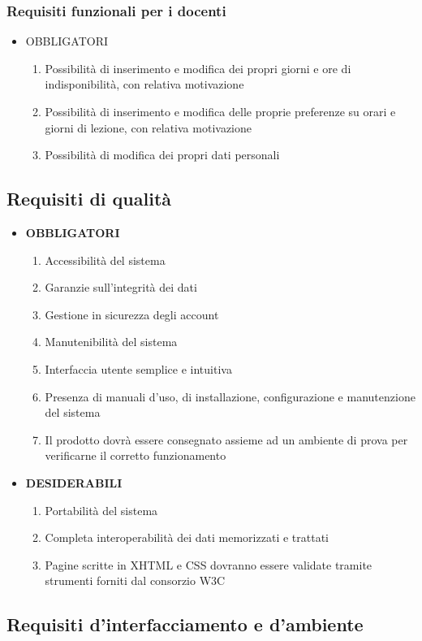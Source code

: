 \documentclass[11pt,a4paper]{article}
\begin{document}
\subsubsection{Requisiti funzionali per i docenti}
\begin{itemize}
\item \textsc{OBBLIGATORI}
\begin{enumerate}
\item Possibilità di inserimento e modifica dei propri giorni e ore di indisponibilità, con relativa motivazione
\item Possibilità di inserimento e modifica delle proprie preferenze su orari e giorni di lezione, con relativa motivazione
\item Possibilità di modifica dei propri dati personali
\end{enumerate}
\end{itemize}
\subsection{Requisiti di qualità}
\begin{itemize}
\item \textbf{OBBLIGATORI}
\begin{enumerate}
\item Accessibilità del sistema
\item Garanzie sull'integrità dei dati
\item Gestione in sicurezza degli account
\item Manutenibilità del sistema
\item Interfaccia utente semplice e intuitiva
\item Presenza di manuali d'uso, di installazione, configurazione e manutenzione del sistema
\item Il prodotto dovrà essere consegnato assieme ad un ambiente di prova per verificarne il corretto funzionamento
\end{enumerate}
\item \textbf{DESIDERABILI}
\begin{enumerate}
\item Portabilità del sistema
\item Completa interoperabilità dei dati memorizzati e trattati
\item Pagine scritte in XHTML e CSS dovranno essere validate tramite strumenti forniti dal consorzio W3C
\end{enumerate}
\end{itemize}
\subsection{Requisiti d'interfacciamento e d'ambiente}
\end{document}
